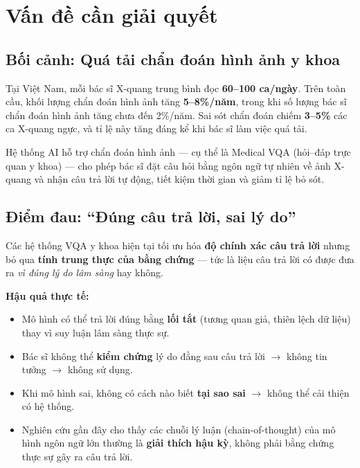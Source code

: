 \documentclass[11pt,a4paper]{article}
\begin{document}
\section{Vấn đề cần giải quyết}

\subsection{Bối cảnh: Quá tải chẩn đoán hình ảnh y khoa}

Tại Việt Nam, mỗi bác sĩ X-quang trung bình đọc \textbf{60--100 ca/ngày}. Trên toàn cầu, khối lượng chẩn đoán hình ảnh tăng \textbf{5--8\%/năm}, trong khi số lượng bác sĩ chẩn đoán hình ảnh tăng chưa đến 2\%/năm. Sai sót chẩn đoán chiếm \textbf{3--5\%} các ca X-quang ngực, và tỉ lệ này tăng đáng kể khi bác sĩ làm việc quá tải.

Hệ thống AI hỗ trợ chẩn đoán hình ảnh --- cụ thể là Medical VQA (hỏi--đáp trực quan y khoa) --- cho phép bác sĩ đặt câu hỏi bằng ngôn ngữ tự nhiên về ảnh X-quang và nhận câu trả lời tự động, tiết kiệm thời gian và giảm tỉ lệ bỏ sót.

\subsection{Điểm đau: ``Đúng câu trả lời, sai lý do''}

\begin{highlightbox}
Các hệ thống VQA y khoa hiện tại tối ưu hóa \textbf{độ chính xác câu trả lời} nhưng bỏ qua \textbf{tính trung thực của bằng chứng} --- tức là liệu câu trả lời có được đưa ra \emph{vì đúng lý do lâm sàng} hay không.
\end{highlightbox}

\textbf{Hậu quả thực tế:}
\begin{itemize}[leftmargin=1.5em]
  \item Mô hình có thể trả lời đúng bằng \textbf{lối tắt} (tương quan giả, thiên lệch dữ liệu) thay vì suy luận lâm sàng thực sự.
  \item Bác sĩ không thể \textbf{kiểm chứng} lý do đằng sau câu trả lời $\to$ không tin tưởng $\to$ không sử dụng.
  \item Khi mô hình sai, không có cách nào biết \textbf{tại sao sai} $\to$ không thể cải thiện có hệ thống.
  \item Nghiên cứu gần đây cho thấy các chuỗi lý luận (chain-of-thought) của mô hình ngôn ngữ lớn thường là \textbf{giải thích hậu kỳ}, không phải bằng chứng thực sự gây ra câu trả lời.
\end{itemize}
\end{document}

